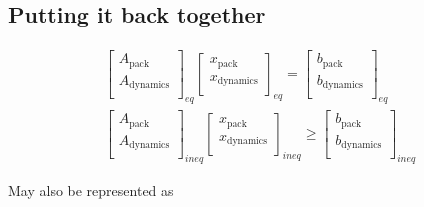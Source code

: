 \documentclass[conference]{IEEEtran}
\begin{document}
\subsection{Putting it back together}\label{putting-it-back-together}

\begin{equation*}
\begin{array}{c}
    \begin{bmatrix}
        A_{\textrm{pack}}     \\
        A_{\textrm{dynamics}} \\
    \end{bmatrix}_{eq}
    \begin{bmatrix}
        x_{\textrm{pack}}     \\
        x_{\textrm{dynamics}} \\
    \end{bmatrix}_{eq} =
    \begin{bmatrix}
        b_{\textrm{pack}}     \\
        b_{\textrm{dynamics}} \\
    \end{bmatrix}_{eq} \\
    \begin{bmatrix}
        A_{\textrm{pack}}     \\
        A_{\textrm{dynamics}} \\
    \end{bmatrix}_{ineq}
    \begin{bmatrix}
        x_{\textrm{pack}}     \\
        x_{\textrm{dynamics}} \\
    \end{bmatrix}_{ineq} \geq
    \begin{bmatrix}
        b_{\textrm{pack}}     \\
        b_{\textrm{dynamics}} \\
    \end{bmatrix}_{ineq}
\end{array}
\end{equation*}

May also be represented as

\scriptsize
\end{document}
